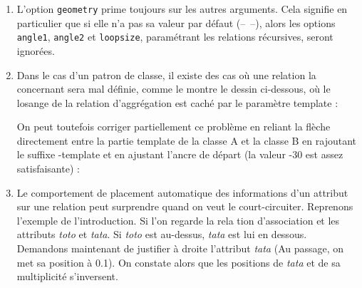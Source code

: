 \documentclass[a4paper,11pt]{report}
\newcommand{\inputTikZ}[1]{%
  }%
\newcommand{\inputTikZ}[1]{%
    \texttt{[image: fig/\#1.pdf]}%
  }%
\begin{document}
\begin{enumerate}
\item L'option {\tt geometry} prime toujours sur les autres arguments. Cela signifie en particulier que si elle n'a pas sa valeur par défaut (--~--), alors les options {\tt angle1}, {\tt angle2} et {\tt loopsize}, paramétrant les relations récursives, seront ignorées.
\item Dans le cas d'un patron de classe, il existe des cas où une relation la concernant sera mal définie, comme le montre le dessin ci-dessous, où le losange de la relation d'aggrégation est caché par le paramètre template :

\begin{minipage}{0.6\textwidth}

\end{minipage}
\begin{minipage}{0.4\textwidth}
\begin{center}
\inputTikZ{figure38}
\end{center}
\end{minipage}

\medskip

On peut toutefois corriger partiellement ce problème en reliant la flèche directement entre la partie template de la classe A et la classe B en rajoutant le suffixe -template et en ajustant l'ancre de départ (la valeur -30 est assez satisfaisante) : 

\medskip

\begin{minipage}{0.6\textwidth}

\end{minipage}
\begin{minipage}{0.4\textwidth}
\begin{center}
\inputTikZ{figure39}
\end{center}
\end{minipage}

\medskip

\item Le comportement de placement automatique des informations d'un attribut sur une relation peut surprendre quand on veut le court-circuiter. Reprenons l'exemple de l'introduction. Si l'on regarde la rela	tion d'association et les attributs {\it toto} et {\it tata}. Si {\it toto} est au-dessus, {\it tata} est lui en dessous. Demandons maintenant de justifier à droite l'attribut {\it tata} (Au passage, on met sa position à 0.1). On constate alors que les positions de {\it tata} et de sa multiplicité s'inversent.

\begin{center}
\inputTikZ{figure40}
\end{center}

\end{enumerate}
\end{document}
